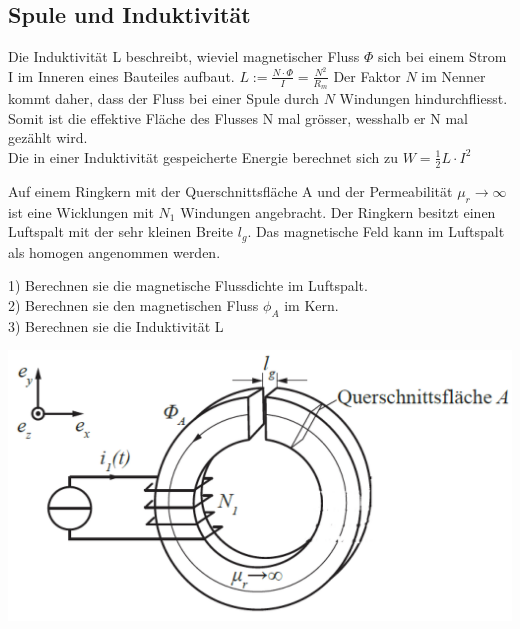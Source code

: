 \subsection{Spule und Induktivität}

\beginip
Die Induktivität L beschreibt, wieviel magnetischer Fluss $\Phi$ sich bei einem Strom I im Inneren eines Bauteiles aufbaut.
\formulaBegin
$ \displaystyle L := \frac{N\cdot \Phi}{I} = \frac{N^2}{R_m} $
\formulaEnd
Der Faktor $N$ im Nenner kommt daher, dass der Fluss bei einer Spule durch $N$ Windungen hindurchfliesst. Somit ist die effektive Fläche des Flusses N mal grösser, wesshalb er N mal gezählt wird. \\

Die in einer Induktivität gespeicherte Energie berechnet sich zu
\formulaBegin
$W =\displaystyle \frac{1}{2}L \cdot I^2$
\formulaEnd
\iend



\beginbsp
Auf einem Ringkern mit der Querschnittsfläche A und der Permeabilität $\mu_r \rightarrow \infty$ ist
eine Wicklungen mit $N_1$ Windungen angebracht. Der Ringkern
besitzt einen Luftspalt mit der sehr kleinen Breite $l_g$. Das magnetische Feld kann im
Luftspalt als homogen angenommen werden.

1) Berechnen sie die magnetische Flussdichte im Luftspalt. \\
2) Berechnen sie den magnetischen Fluss $\phi_A$ im Kern.\\
3) Berechnen sie die Induktivität L
\begin{center}

	\includegraphics[scale=0.25]{img/induktivitaet_bsp_1.PNG}

\end{center}

\iend
\newpage

